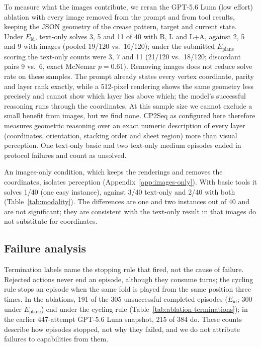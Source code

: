 To measure what the images contribute, we reran the GPT-5.6 Luna (low effort) ablation with
every image removed from the prompt and from tool results, keeping the JSON geometry of the crease
pattern, target and current state. Under $E_{\mathrm{id}}$, text-only solves 3, 5 and 11 of 40 with
B, L and L+A, against 2, 5 and 9 with images (pooled 19/120 vs.\ 16/120); under the submitted
$E_{\mathrm{plane}}$ scoring the text-only counts were 3, 7 and 11 (21/120 vs.\ 18/120; discordant
pairs 9 vs.\ 6, exact McNemar $p=0.61$). Removing images does not reduce solve rate on these
samples. The prompt already states every vertex coordinate, parity and layer rank exactly, while a
512-pixel rendering shows the same geometry less precisely and cannot show which layer lies above
which; the model's successful reasoning runs through the coordinates. At this sample size we
cannot exclude a small benefit from images, but we find none. CP2Seq as configured here therefore
measures geometric reasoning over an exact numeric description of every layer (coordinates,
orientation, stacking order and sheet region) more than visual perception. One
text-only basic and two text-only medium episodes ended in protocol failures and count as unsolved.

An images-only condition, which keeps the renderings and removes the coordinates, isolates
perception (Appendix~\ref{app:images-only}). With basic tools it solves 1/40 (one easy instance),
against 3/40 text-only and 2/40 with both (Table~\ref{tab:modality}). The differences are one and
two instances out of 40 and are not significant; they are consistent with the text-only result in
that images do not substitute for coordinates.



\subsection{Failure analysis}


Termination labels name the stopping rule that fired, not the cause of failure. Rejected
actions never end an episode, although they consume turns; the cycling rule stops an episode
when the same fold is played from the same position three times. In the ablations, 191 of the 305
unsuccessful completed episodes ($E_{\mathrm{id}}$; 300 under $E_{\mathrm{plane}}$) end under the cycling rule (Table~\ref{tab:ablation-terminations}); in the
earlier 447-attempt GPT-5.6 Luna snapshot, 215 of 384 do. These counts describe how episodes
stopped, not why they failed, and we do not attribute failures to capabilities from them.

